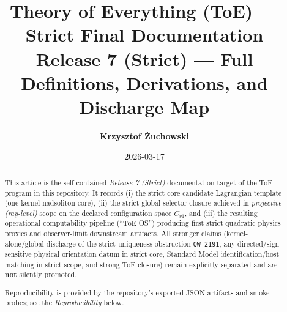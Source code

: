 \documentclass[11pt,a4paper]{article}
\title{\textbf{Theory of Everything (ToE) --- Strict Final Documentation}\\
\large Release 7 (Strict) --- Full Definitions, Derivations, and Discharge Map}
\author{\textbf{Krzysztof Żuchowski}}
\date{2026-03-17}
\begin{document}
\maketitle

\begin{abstract}
This article is the self-contained \emph{Release 7 (Strict)} documentation target of the ToE program in this repository.
It records (i) the strict core candidate Lagrangian template (one-kernel nadsoliton core), (ii) the strict global selector
closure achieved in \emph{projective (ray-level)} scope on the declared configuration space $C_{v1}$, and (iii) the resulting
operational computability pipeline (“ToE OS”) producing first strict quadratic physics proxies and observer-limit downstream artifacts.
All stronger claims (kernel-alone/global discharge of the strict uniqueness obstruction \texttt{QW-2191}, any directed/sign-sensitive
physical orientation datum in strict core, Standard Model identification/host matching in strict scope, and strong ToE closure)
remain explicitly separated and are \textbf{not} silently promoted.

Reproducibility is provided by the repository’s exported JSON artifacts and smoke probes; see the \emph{Reproducibility}
below.
\end{abstract}
\end{document}
